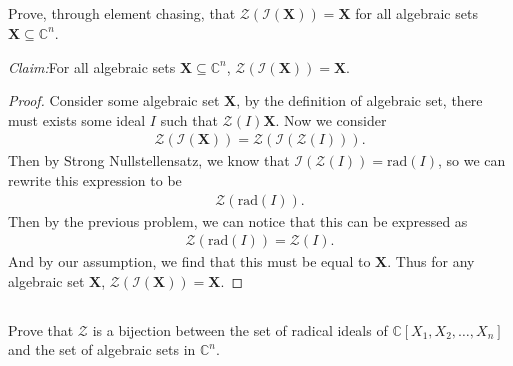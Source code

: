 \documentclass[10pt]{amsart}
\newcommand{\C}{\mathbb{C}}
\newcommand{\rad}[1]{\text{rad}\left(#1\right)}
\newenvironment{claim}[1]{\par\noindent\textit{Claim:}\space#1}{}
\begin{document}
\subsection{}%
\label{sub:4c}

Prove, through element chasing, that
$\mathscr{Z}(\mathscr{I}(\mathbf{X}))=\mathbf{X}$ for all algebraic sets
$\mathbf{X}\subseteq\C^n$.

\begin{claim}
  For all algebraic sets $\mathbf{X}\subseteq\C^n$,
  $\mathscr{Z}(\mathscr{I}(\mathbf{X}))=\mathbf{X}$.
\end{claim}
\begin{proof}
  Consider some algebraic set $\mathbf{X}$, by the definition of algebraic set,
  there must exists some ideal $I$ such that $\mathscr{Z}(I)\mathbf{X}$. Now we
  consider
  \begin{align*}
    \mathscr{Z}(\mathscr{I}(\mathbf{X}))=\mathscr{Z}(\mathscr{I}(\mathscr{Z}(I))).
  \end{align*}
  Then by Strong Nullstellensatz, we know that
  $\mathscr{I}(\mathscr{Z}(I))=\rad{I}$, so we can rewrite this expression to
  be
  \begin{align*}
    \mathscr{Z}(\rad{I}).
  \end{align*}
  Then by the previous problem, we can notice that this can be expressed as
  \begin{align*}
    \mathscr{Z}(\rad{I})=\mathscr{Z}(I).
  \end{align*}
  And by our assumption, we find that this must be equal to $\mathbf{X}$. Thus
  for any algebraic set $\mathbf{X}$,
  $\mathscr{Z}(\mathscr{I}(\mathbf{X}))=\mathbf{X}$.
\end{proof}

\subsection{}%
\label{sub:4d}

Prove that $\mathscr{Z}$ is a bijection between the set of radical ideals of
$\C[X_1,X_2,\ldots,X_n]$ and the set of algebraic sets in $\C^n$.
\end{document}
